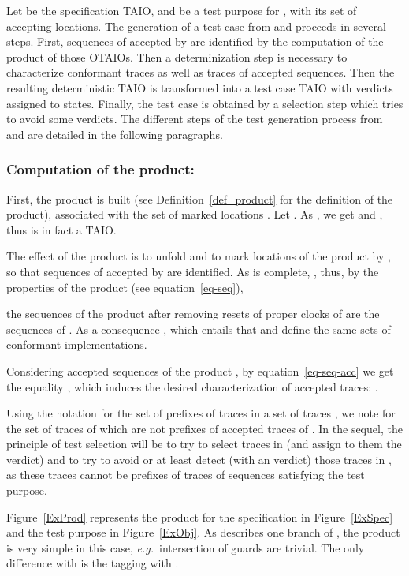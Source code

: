 \documentclass{LMCS}
\theoremstyle{plain}\newtheorem{proposition}[thm]{Proposition}
\def\eg{{\em e.g.}}
\begin{document}
Let  be the specification
TAIO, and  be a test purpose for ,
with its set  of accepting locations.  The generation of
a test case  from  and  proceeds in several steps.
First, sequences of  accepted by  are identified by the
computation of the product  of those OTAIOs.  Then a
determinization step is necessary to characterize conformant traces as
well as traces of accepted sequences.  Then the resulting
deterministic TAIO  is transformed into a test case TAIO 
with verdicts assigned to states.  Finally, the test case  is
obtained by a selection step which tries to avoid some 
verdicts.  The different steps of the test generation process from
 and  are detailed in the following paragraphs.


\subsubsection*{Computation of the product:} 
First, the product 
is built
(see Definition~\ref{def_product} for the definition of the product), 
associated with the set
of marked locations .
Let . 
As , we get  and , thus  is in fact a TAIO.

The effect of the product is to unfold 
and to mark locations of the product by , 
so that sequences of  accepted by  are identified.
As  is complete, 
,
thus, by the properties of the product (see equation~\ref{eq-seq}),
 
\ie the sequences of the product after removing resets of proper clocks of 
are the sequences of .
As a consequence 
, which entails that  and 
define the same sets of conformant implementations.  

 Considering accepted sequences of the product , 
by equation~\ref{eq-seq-acc} we  get the equality
, 
which induces the desired characterization of accepted traces: 
.

Using the notation  
for the set of prefixes
of traces in a set of traces ,
we note 
for the set of traces of  which are not prefixes of accepted traces of .
In the sequel, 
the principle of test selection will be to try to select traces in
 (and assign to them the  verdict)
and to try to avoid or at least detect (with an  verdict) 
those traces in , as
these traces cannot be prefixes of traces of sequences satisfying the test purpose.

\begin{exa}
Figure~\ref{ExProd} represents the product  for the specification
 in Figure~\ref{ExSpec} and the test purpose  in
Figure~\ref{ExObj}. 
As  describes one branch of , the product is very simple in this case,
\eg~intersection of guards are trivial.
The only difference with  is the  tagging with .
\end{exa}
\end{document}
